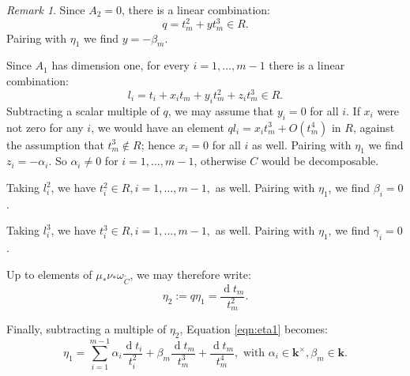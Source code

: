 \documentclass{compositio}
\renewcommand{\k}{\mathbf k}
\theoremstyle{plain}
\theoremstyle{definition}
\theoremstyle{remark}
\newtheorem{rem}[thm]{Remark}
\begin{document}
\begin{rem}
Since $A_2=0$, there is a linear combination:
\[ q=t_m^2+yt_m^3\in R.\]
Pairing with $\eta_1$ we find $y=-\beta_m$.

Since $A_1$ has dimension one, for every $i=1,\ldots,m-1$ there is a linear combination:
\[ l_i=t_i+x_it_m+y_it_m^2+z_it_m^3\in R.\]
Subtracting a scalar multiple of $q$, we may assume that $y_i=0$ for all $i$. If $x_i$ were not zero for any $i$, we would have an element $ql_i=x_it_m^3+O(t_m^4)$ in $R$, against the assumption that $t_m^3\notin R$; hence $x_i=0$ for all $i$ as well. Pairing with $\eta_1$ we find $z_i=-\alpha_i$. So $\alpha_i\neq0$ for $i=1,\ldots,m-1$, otherwise $C$ would be decomposable. 

\noindent Taking $l_i^2$, we have $t_i^2\in R, i=1,\ldots,m-1,$ as well. Pairing with $\eta_1$, we find $\beta_i=0$.

\noindent Taking $l_i^3$, we have $t_i^3\in R, i=1,\ldots,m-1,$ as well. Pairing with $\eta_1$, we find $\gamma_i=0$.

Up to elements of $\mu_*\nu_*\omega_{\widetilde C}$, we may therefore write:
\[\eta_2:= q\eta_1=\frac{\operatorname{d} t_m}{t_m^2}.\]

Finally, subtracting a multiple of $\eta_2$, Equation \eqref{eqn:eta1} becomes:
\[\eta_1=\sum_{i=1}^{m-1} \alpha_i \frac{\operatorname{d} t_i}{t_i^2}+ \beta_m \frac{\operatorname{d} t_m}{t_m^3}+  \frac{\operatorname{d} t_m}{t_m^4}, \text{ with } \alpha_i\in\k^\times,\beta_m\in\k.\]

\end{rem}
\end{document}
